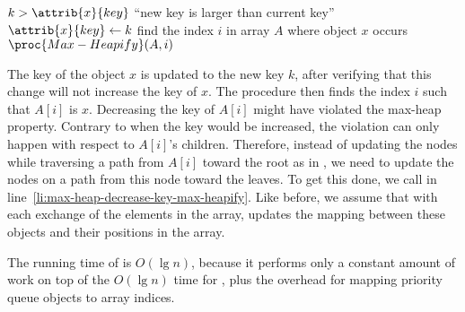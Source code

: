 \indent\begin{codebox}
\li \If $k>\attrib{x}{key}$
\li     \Then \Error ``new key is larger than current key''
        \End
\li $\attrib{x}{key}\gets k$
\li find the index $i$ in array $A$ where object $x$ occurs
\li $\proc{Max-Heapify}(A,i)$ \label{li:max-heap-decrease-key-max-heapify}
\end{codebox}

The key of the object $x$ is updated to the new key $k$, after verifying that this change will not increase the key of $x$.
The procedure then finds the index $i$ such that $A[i]$ is $x$.
Decreasing the key of $A[i]$ might have violated the max-heap property.
Contrary to when the key would be increased, the violation can only happen with respect to $A[i]$'s children.
Therefore, instead of updating the nodes while traversing a path from $A[i]$ toward the root as in , we need to update the nodes on a path from this node toward the leaves.
To get this done, we call  in line~\ref{li:max-heap-decrease-key-max-heapify}.
Like before, we assume that with each exchange of the elements in the array,  updates the mapping between these objects and their positions in the array.

The running time of  is $O(\lg n)$, because it performs only a constant amount of work on top of the $O(\lg n)$ time for , plus the overhead for mapping priority queue objects to array indices.
